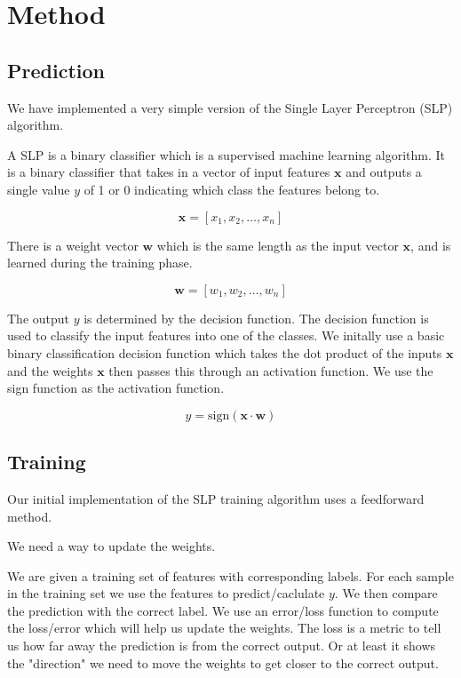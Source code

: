 \section{Method}
\label{sec:method}

\subsection{Prediction}

We have implemented a very simple version of the Single Layer Perceptron (SLP) algorithm.

A SLP is a binary classifier which is a supervised machine learning algorithm. It is a binary classifier that takes in a vector of input features $\boldsymbol{x}$ and outputs a single value $y$ of 1 or 0 indicating which class the features belong to. 

\begin{equation}
\boldsymbol{x} = [x_1, x_2, \ldots, x_n]
\label{eq:input_vector_x}
\end{equation}

There is a weight vector $\boldsymbol{w}$ which is the same length as the input vector $\boldsymbol{x}$, and is learned during the training phase.

\begin{equation}
  \boldsymbol{w} = [w_1, w_2, \ldots, w_n]
  \label{eq:weight_vector_w}
\end{equation}

The output $y$ is determined by the decision function. The decision function is used to classify the input features into one of the classes. We initally use a basic binary classification decision function which takes the dot product of the inputs $\boldsymbol{x}$ and the weights $\boldsymbol{x}$ then passes this through an activation function. We use the sign function as the activation function.

\begin{equation}
  y = \text{sign}(\boldsymbol{x} \cdot \boldsymbol{w})
  \label{eq:decision_function}
\end{equation}


\subsection{Training}

Our initial implementation of the SLP training algorithm uses a feedforward method.

We need a way to update the weights.

We are given a training set of features with corresponding labels. For each sample in the training set we use the features to predict/caclulate $y$. We then compare the prediction with the correct label. We use an error/loss function to compute the loss/error which will help us update the weights. The loss is a metric to tell us how far away the prediction is from the correct output. Or at least it shows the "direction" we need to move the weights to get closer to the correct output.  
